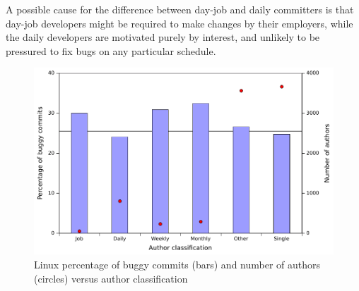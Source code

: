 A possible cause for the difference between day-job and daily
committers is that day-job developers might be required to make
changes by their employers, while the daily developers are motivated
purely by interest, and unlikely to be pressured to fix bugs on any
particular schedule.

\begin{figure}
\begin{center}
\includegraphics[width=\columnwidth]{linux-bugginess-author-class.pdf}
\end{center}
\caption{Linux percentage of buggy commits (bars) and number of authors (circles) versus author classification}
\label{fig-linux-bugginess-author-class}
\end{figure}




